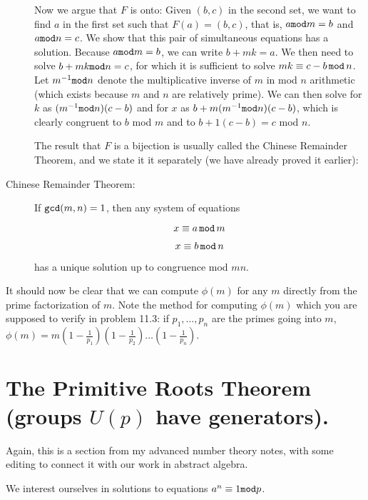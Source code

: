 \documentclass[12pt]{article}
\begin{document}
\begin{description}
Now we argue that $F$ is onto:   Given $(b,c)$ in the second set, we want to find $a$ in the first set such that $F(a)=(b,c)$, that is, $a{\tt mod}m=b$ and $a{\tt mod}n=c$.   We show that this pair of simultaneous equations has a solution.
Because $a{\tt mod}m=b$, we can write $b+mk=a$.   We then need to solve $b+mk{\tt mod}n=c$, for which it is sufficient to solve $mk\equiv c-b\,{\tt mod}\,n$.   Let $m^{-1}{\tt mod}n$ denote the multiplicative inverse of $m$ in mod $n$ arithmetic (which exists because $m$ and $n$ are relatively prime).  We can then solve for $k$ as $(m^{-1}{\tt mod}n)(c-b)$ and for $x$ as $b+m(m^{-1}{\tt mod}n)(c-b)$, which is clearly congruent to $b$ mod $m$ and to $b+1(c-b)=c$ mod $n$.

The result that $F$ is a bijection is usually called the Chinese Remainder Theorem, and we state it it separately (we have already proved it earlier):

\newpage

\item[Chinese Remainder Theorem:]   If ${\tt gcd}(m,n)=1$, then any system of equations

$$x\equiv a\,{\tt mod}\,m$$

$$x \equiv b\,{\tt mod}\,n$$

has a unique solution up to congruence mod $mn$.

\end{description}

It should now be clear that we can compute $\phi(m)$ for any $m$ directly from the prime factorization of $m$.   Note the method for computing $\phi(m)$ which you are supposed to verify in problem 11.3:
if $p_1,\ldots,p_n$ are the primes going into $m$, $\phi(m)=m(1-\frac1{p_1})(1-\frac1{p_2})\ldots(1-\frac1{p_n})$.

\section{The Primitive Roots Theorem (groups $U(p)$ have generators).}

Again, this is a section from my advanced number theory notes, with some editing to connect it with our work in abstract algebra.

We interest ourselves in solutions to equations $a^n \equiv 1 {\tt mod} p$.
\end{document}
